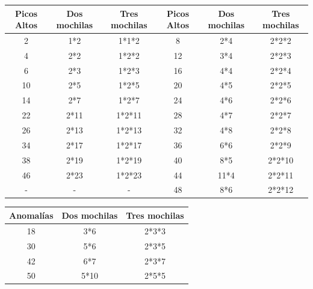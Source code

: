 \documentclass[spanish,12pt]{article}
\begin{document}
{\begin{center}
 \begin{tabular}{|c |c |c|||c|c|c|}
 \hline
 Picos Altos & Dos mochilas & Tres mochilas&Picos Altos & Dos mochilas & Tres mochilas\\ [0.5ex]
 \hline\hline
 2 & 1*2 & 1*1*2 & 8 & 2*4 & 2*2*2 \\
 \hline
 4 & 2*2 & 1*2*2 & 12 & 3*4 & 2*2*3\\
 \hline
 6 & 2*3 & 1*2*3 & 16 & 4*4 & 2*2*4\\
 \hline
 10 & 2*5 & 1*2*5 & 20 & 4*5 & 2*2*5 \\
 \hline
 14 & 2*7 & 1*2*7 & 24 & 4*6 & 2*2*6 \\
 \hline
 22 & 2*11 & 1*2*11 & 28 & 4*7 & 2*2*7\\
 \hline
 26 & 2*13 & 1*2*13 & 32 & 4*8 & 2*2*8\\
 \hline
 34 & 2*17 & 1*2*17 & 36 & 6*6 & 2*2*9\\
 \hline
 38 & 2*19 & 1*2*19 & 40 & 8*5 & 2*2*10\\
 \hline
 46 & 2*23 & 1*2*23 & 44 & 11*4 & 2*2*11\\
 \hline
- & - & - & 48 & 8*6 & 2*2*12\\ [1ex]
 \hline
\end{tabular}
\end{center}



\begin{center}
 \begin{tabular}{|c | c | c|}
 \hline
 Anomalías & Dos mochilas & Tres mochilas  \\ [0.5ex]
 \hline\hline
 18 & 3*6 & 2*3*3  \\
 \hline
 30 & 5*6 & 2*3*5 \\
 \hline
 42 & 6*7 & 2*3*7 \\
 \hline
 50 & 5*10 & 2*5*5  \\ [1ex]
 \hline
\end{tabular}
\end{center}




}
\end{document}
